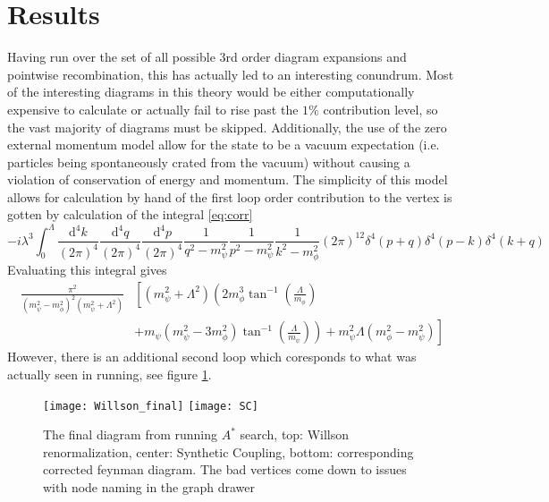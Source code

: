 \documentclass{article}
\newcommand{\dd}{\textrm{d}}
\begin{document}
\section{Results}
\hspace{0.5 cm} Having run over the set of all possible 3rd order diagram expansions and pointwise recombination, this has actually led to an interesting conundrum. Most of the interesting diagrams in this theory would be either computationally expensive to calculate or actually fail to rise past the $1\%$ contribution level, so the vast majority of diagrams must be skipped. 
Additionally, the use of the zero external momentum model allow for the state to be a vacuum expectation (i.e. particles being spontaneously crated from the vacuum) without causing a violation of conservation of energy and momentum.  
The simplicity of this model allows for calculation by hand of the first loop order contribution to the vertex is gotten by calculation of the integral \ref{eq:corr}
\begin{equation}
	-i \lambda^3 \int_0^\Lambda \frac{\dd^4 k}{(2\pi)^4} \frac{\dd^4 q}{(2 \pi)^4 }\frac{\dd^4 p}{(2 \pi)^4}\frac{1}{q^2 -m_{\psi}^2} \frac{1}{p^2-m_{\psi}^2} \frac{1}{k^2-m_{\phi}^2} (2\pi)^{12} \delta^4(p+q) \delta^4(p-k) \delta^4(k+q)  
\label{eq:corr}
\end{equation}
Evaluating this integral gives 
\begin{equation}
	\begin{split}
		\frac{\pi^2}{(m_\psi^2 - m_\phi^2)^2(m_\psi^2 + \Lambda^2)} & \left[ (m_\psi^2 + \Lambda^2) \left( 2 m_\phi^3 \tan^{-1} \left( \frac{\Lambda}{m_\phi} \right) \right. \right. \\
		& \left. \left. + m_\psi (m_\psi^2 - 3 m_\phi^2 ) \tan^{-1} \left( \frac{\Lambda}{m_\psi} \right) \right) + m_\psi^2 \Lambda \left( m_\phi^2 - m_\psi^2 \right) \right] 
	\end{split}
\end{equation}
However, there is an additional second loop which coresponds to what was actually seen in running, see figure \ref{fig:run_results}.
\begin{figure}[h!]
	\begin{center}
		\texttt{[image: Willson\_final]}
		\texttt{[image: SC]}
		\caption{The final diagram from running $A^*$ search, top: Willson renormalization, center: Synthetic Coupling, bottom: corresponding corrected feynman diagram. The bad vertices come down to issues with node naming in the graph drawer}
		\label{fig:run_results}
	\end{center}
\end{figure}
\end{document}
